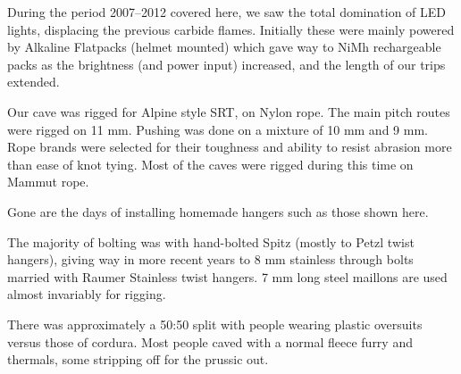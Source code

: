 During the period 2007--2012 covered here, we saw the total domination
of LED lights, displacing the previous carbide flames. Initially these
were mainly powered by Alkaline Flatpacks (helmet mounted) which gave
way to NiMh rechargeable packs as the brightness (and power input)
increased, and the length of our trips extended.

Our cave was rigged for Alpine style SRT, on Nylon rope. The main pitch
routes were rigged on 11 mm. Pushing was done on a mixture of 10 mm and
9 mm. Rope brands were selected for their toughness and ability to
resist abrasion more than ease of knot tying. Most of the caves were
rigged during this time on Mammut rope.

\begin{marginfigure}
\checkoddpage \ifoddpage \forcerectofloat \else \forceversofloat \fi
\centering
 \caption{Gone are the days of installing homemade hangers such as those shown here. }
 \label{homemade hanger}
\end{marginfigure}

The majority of bolting was with hand-bolted Spitz (mostly to Petzl
twist hangers), giving way in more recent years to 8 mm stainless through
bolts married with Raumer Stainless twist hangers. 7 mm long steel
maillons are used almost invariably for rigging.

There was approximately a 50:50 split with people wearing plastic
oversuits versus those of cordura. Most people caved with a normal
fleece furry and thermals, some stripping off for the prussic out.

